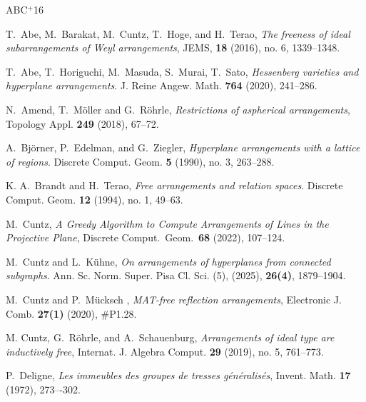 \documentclass[12pt]{amsart}
\numberwithin{equation}{section}
\theoremstyle{plain}
\theoremstyle{definition}
\begin{document}
\newcommand{\etalchar}[1]{$^{#1}$}
\providecommand{\bysame}{\leavevmode\hbox to3em{\hrulefill}\thinspace}
\providecommand{\MR}{\relax\ifhmode\unskip\space\fi MR }
\providecommand{\MRhref}[2]{%
  \href{http://www.ams.org/mathscinet-getitem?mr=#1}{#2} }
\providecommand{\href}[2]{#2}
\begin{thebibliography}{ABC{\etalchar{+}}16}

\bibitem[ABC{\etalchar{+}}16]{abeetall:weyl}
T.~Abe, M.~Barakat, M.~Cuntz, T.~Hoge, and H.~Terao,
\emph{The freeness of ideal subarrangements of Weyl arrangements},
JEMS,  \textbf{18} (2016), no. 6, 1339--1348.

	\bibitem[AHM{\etalchar{+}}20]{abeetal:hess}
T.~Abe, T.~Horiguchi, M.~Masuda, S.~Murai, T.~Sato, 
\emph{Hessenberg varieties and hyperplane arrangements}. J. Reine Angew. Math. \textbf{764} (2020), 241--286.

N.~Amend, T.~M\"oller and G.~R\"ohrle, 
\emph{Restrictions of aspherical arrangements},
Topology Appl. \textbf{ 249}  (2018), 67--72.

 A.~Bj\"orner, P.~Edelman, and G.~Ziegler,
 \emph{Hyperplane arrangements with a lattice of regions}.
 Discrete Comput. Geom. \textbf{5} (1990), no. 3, 263--288.  
 
 K. A.~Brandt and H.~Terao, 
 \emph{Free arrangements and relation spaces}. 
 Discrete Comput. Geom. \textbf{12} (1994), no. 1, 49--63. 

M.~Cuntz,
\emph{A Greedy Algorithm to Compute Arrangements of Lines in the Projective Plane},
Discrete Comput.\ Geom.\ \textbf{68} (2022), 107--124.

	M.~Cuntz and L.~Kühne, 
	\emph{On arrangements of hyperplanes from connected subgraphs}. Ann. Sc. Norm. Super. Pisa Cl. Sci. (5),  (2025),  \textbf{26(4)}, 1879--1904.

	M.~Cuntz and P.~M\"ucksch , \emph{MAT-free reflection arrangements}, Electronic J. Comb. \textbf{27(1)} (2020), \#P1.28.
	
	M. Cuntz, G.~R\"ohrle, and A.~Schauenburg,
	\emph{Arrangements of ideal type are inductively free},
	Internat. J. Algebra Comput.  \textbf{29} (2019), no. 5, 761--773. 

P.~Deligne,
\emph{Les immeubles des groupes de tresses g\'en\'eralis\'es},
Invent. Math. \textbf{17} (1972), 273–-302.


\end{thebibliography}
\end{document}
